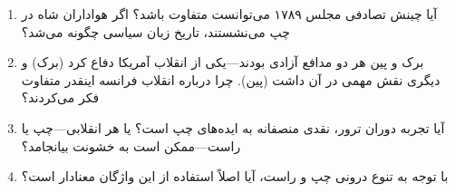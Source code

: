 \begin{questionbox}

\begin{enumerate}[nosep, rightmargin=1cm]
    \item آیا چینش تصادفی مجلس ۱۷۸۹ می‌توانست متفاوت باشد؟ اگر هواداران شاه در چپ می‌نشستند، تاریخ زبان سیاسی چگونه می‌شد؟

    \item برک و پین هر دو مدافع آزادی بودند—یکی از انقلاب آمریکا دفاع کرد (برک) و دیگری نقش مهمی در آن داشت (پین). چرا درباره انقلاب فرانسه اینقدر متفاوت فکر می‌کردند؟

    \item آیا تجربه دوران ترور، نقدی منصفانه به ایده‌های چپ است؟ یا هر انقلابی—چپ یا راست—ممکن است به خشونت بیانجامد؟

    \item با توجه به تنوع درونی چپ و راست، آیا اصلاً استفاده از این واژگان معنادار است؟
\end{enumerate}

\end{questionbox}

